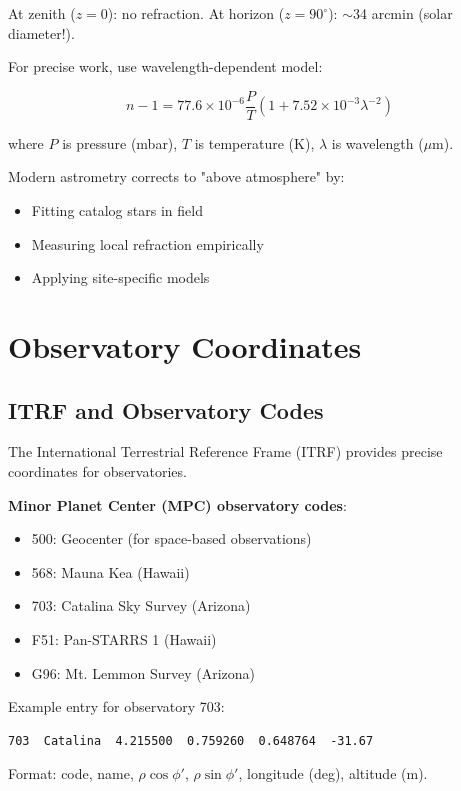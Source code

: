 At zenith ($z = 0$): no refraction. At horizon ($z = 90^\circ$): $\sim$34 arcmin (solar diameter!).

For precise work, use wavelength-dependent model:

\begin{equation}
    n - 1 = 77.6 \times 10^{-6} \frac{P}{T}\left(1 + 7.52 \times 10^{-3}\lambda^{-2}\right)
\end{equation}

where $P$ is pressure (mbar), $T$ is temperature (K), $\lambda$ is wavelength ($\mu$m).

Modern astrometry corrects to "above atmosphere" by:
\begin{itemize}
    \item Fitting catalog stars in field
    \item Measuring local refraction empirically
    \item Applying site-specific models
\end{itemize}

\section{Observatory Coordinates}

\subsection{ITRF and Observatory Codes}

The International Terrestrial Reference Frame (ITRF) provides precise coordinates for observatories.

\textbf{Minor Planet Center (MPC) observatory codes}:
\begin{itemize}
    \item 500: Geocenter (for space-based observations)
    \item 568: Mauna Kea (Hawaii)
    \item 703: Catalina Sky Survey (Arizona)
    \item F51: Pan-STARRS 1 (Hawaii)
    \item G96: Mt. Lemmon Survey (Arizona)
\end{itemize}

Example entry for observatory 703:
\begin{verbatim}
703  Catalina  4.215500  0.759260  0.648764  -31.67
\end{verbatim}

Format: code, name, $\rho \cos\phi'$, $\rho \sin\phi'$, longitude (deg), altitude (m).

